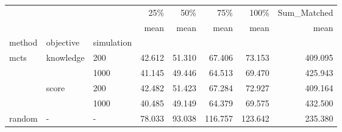 \begin{tabular}{lllrrrrr}
\toprule
       &   &   &    25\% &    50\% &     75\% &    100\% & Sum\_Matched \\
       &   &   &   mean &   mean &    mean &    mean &        mean \\
method & objective & simulation &        &        &         &         &             \\
\midrule
mcts & knowledge & 200 & 42.612 & 51.310 &  67.406 &  73.153 &     409.095 \\
       &   & 1000 & 41.145 & 49.446 &  64.513 &  69.470 &     425.943 \\
       & score & 200 & 42.482 & 51.423 &  67.284 &  72.927 &     409.164 \\
       &   & 1000 & 40.485 & 49.149 &  64.379 &  69.575 &     432.500 \\
random & - & - & 78.033 & 93.038 & 116.757 & 123.642 &     235.380 \\
\bottomrule
\end{tabular}
